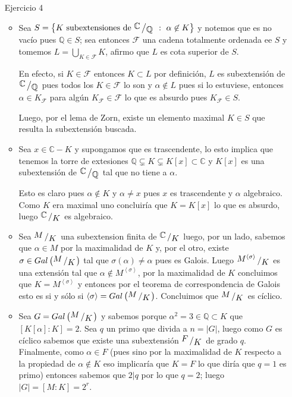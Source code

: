 \documentclass[11pt]{article}
\newcommand{\F}{\mathcal{F}}
\newcommand{\C}{\mathbb{C}}
\newcommand{\Q}{\mathbb{Q}}
\newcommand\tq{~:~}
\newcommand{\abs}[1]{\left\lvert#1\right\rvert}
\newcommand{\ip}[1]{\left\langle#1\right\rangle}
\newcommand{\sett}[1]{\left\lbrace#1\right\rbrace}
\newcommand{\Bigcup}[2]{\bigcup\limits_{#1}{#2}}
\newcommand{\quotient}[2]{{\raisebox{.2em}{$#1$}\left/\raisebox{-.2em}{$#2$}\right.}}
\numberwithin{theorem}{subsection}
\begin{document}
\begin{enumerate}
\begin{itemize}
	\end{itemize}
	
	\item[Ejercicio 4]
	
	\begin{itemize}
		\item Sea $S = \sett{K \text{ subextensiones de } \quotient{\C}{\Q} \tq \alpha \not \in K}$ y notemos que es no vac\'io pues $\Q \in S$; sea entonces $\F$ una cadena totalmente ordenada ee $S$ y tomemos $L = \Bigcup{K \in \F}{K}$, afirmo que $L$ es cota superior de $S$.
		
		En efecto, si $K \in \F$ entonces $K \subset L$ por definici\'on, $L$ es subextensi\'on de $\quotient{\C}{\Q}$ pues todos los $K \in \F$ lo son y $\alpha \not \in L$ pues si lo estuviese, entonces $\alpha \in K_{\F}$ para alg\'un $K_{\F} \in \F$ lo que es absurdo pues $K_{\F} \in S$.
	
		Luego, por el lema de Zorn, existe un elemento maximal $K \in S$ que resulta la subextensi\'on buscada.
		
		\item Sea $x \in \C - K$ y supongamos que es trascendente, lo esto implica que tenemos la torre de extesiones $\Q \subsetneq K \subsetneq K[x] \subset \C$ y $K[x]$ es una subextensi\'on de $\quotient{\C}{\Q}$ tal que no tiene a $\alpha$.
		
		Esto es claro pues $\alpha \not \in K$ y $\alpha \neq x$ pues $x$ es trascendente y $\alpha$ algebraico. Como $K$ era maximal uno concluir\'ia que $K = K[x]$ lo que es absurdo, luego $\quotient{\C}{K}$ es algebraico.
	
		\item Sea $\quotient{M}{K}$ una subextension finita de $\quotient{\C}{K}$ luego, por un lado, sabemos que $\alpha \in M$ por la maximalidad de $K$ y, por el otro, existe  $\sigma \in Gal\left(\quotient{M}{K}\right)$ tal que $\sigma(\alpha) \neq \alpha$ pues es Galois. Luego $\quotient{M^{\ip{\sigma}}}{K}$ es una extensi\'on tal que $\alpha \not \in M^{\ip{\sigma}}$, por la maximalidad de $K$ concluimos que $K = M^{\ip{\sigma}}$ y entonces por el teorema de correspondencia de Galois esto es si y s\'olo si $\ip{\sigma} = Gal\left(\quotient{M}{K}\right)$. Concluimos que $\quotient{M}{K}$ es c\'iclico.
	
		\item Sea $G = Gal\left(\quotient{M}{K}\right)$ y sabemos porque $\alpha^2 = 3 \in \Q \subset K$ que $[K[\alpha]:K] = 2$. Sea $q$ un primo que divida a $n = \abs{G}$, luego como $G$ es c\'iclico sabemos que existe una subextensi\'on $\quotient{F}{K}$ de grado $q$. Finalmente, como $\alpha \in F$ (pues sino por la maximalidad de $K$ respecto a la propiedad de $\alpha \not \in K$ eso implicar\'ia que $K=F$ lo que dir\'ia que $q=1$ es primo) entonces sabemos que $2 \vert q$ por lo que $q = 2$; luego $\abs{G} = [M:K] = 2^r$.
		

\end{itemize}
\end{enumerate}
\end{document}
